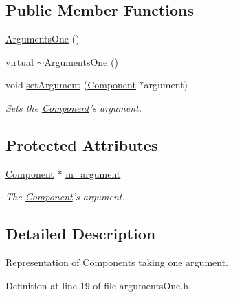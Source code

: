 \subsection*{Public Member Functions}
\begin{DoxyCompactItemize}
\item 
\hyperlink{classkissms_1_1_arguments_one_ad4bcc97fc91b51c8fbca79ce79e3403b}{Arguments\-One} ()
\item 
virtual \hyperlink{classkissms_1_1_arguments_one_aa340e54444664feca6977c521a2fb8c1}{$\sim$\-Arguments\-One} ()
\item 
void \hyperlink{classkissms_1_1_arguments_one_a96b3107c4779c1e5843a6fad91145f92}{set\-Argument} (\hyperlink{classkissms_1_1_component}{Component} $\ast$argument)
\begin{DoxyCompactList}\small\item\em Sets the \hyperlink{classkissms_1_1_component}{Component}'s argument. \end{DoxyCompactList}\end{DoxyCompactItemize}
\subsection*{Protected Attributes}
\begin{DoxyCompactItemize}
\item 
\hyperlink{classkissms_1_1_component}{Component} $\ast$ \hyperlink{classkissms_1_1_arguments_one_a13edd850fa593c54b343b4538b99a190}{m\-\_\-argument}
\begin{DoxyCompactList}\small\item\em The \hyperlink{classkissms_1_1_component}{Component}'s argument. \end{DoxyCompactList}\end{DoxyCompactItemize}


\subsection{Detailed Description}
Representation of Components taking one argument. 

Definition at line 19 of file arguments\-One.\-h.



